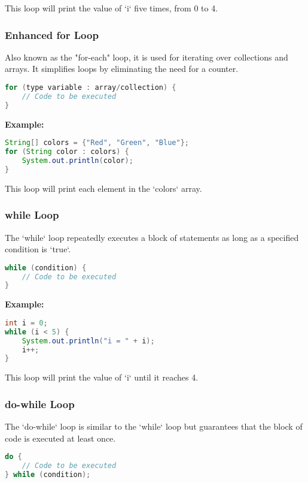 \documentclass{article}
\begin{document}
This loop will print the value of `i` five times, from 0 to 4.

\subsubsection{Enhanced for Loop}
Also known as the "for-each" loop, it is used for iterating over collections and arrays. It simplifies loops by eliminating the need for a counter.

\begin{lstlisting}[language=Java]
for (type variable : array/collection) {
    // Code to be executed
}
\end{lstlisting}

\newpage
\textbf{Example:}

\begin{lstlisting}[language=Java]
String[] colors = {"Red", "Green", "Blue"};
for (String color : colors) {
    System.out.println(color);
}
\end{lstlisting}

This loop will print each element in the `colors` array.

\subsubsection{while Loop}
The `while` loop repeatedly executes a block of statements as long as a specified condition is `true`.

\begin{lstlisting}[language=Java]
while (condition) {
    // Code to be executed
}
\end{lstlisting}


\textbf{Example:}

\begin{lstlisting}[language=Java]
int i = 0;
while (i < 5) {
    System.out.println("i = " + i);
    i++;
}
\end{lstlisting}

This loop will print the value of `i` until it reaches 4.

\subsubsection{do-while Loop}
The `do-while` loop is similar to the `while` loop but guarantees that the block of code is executed at least once.

\begin{lstlisting}[language=Java]
do {
    // Code to be executed
} while (condition);
\end{lstlisting}
\end{document}
